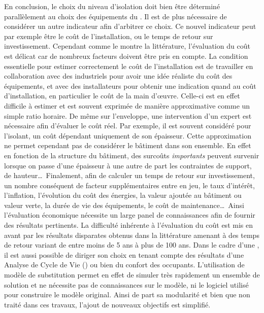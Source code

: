En conclusion, le choix du niveau d’isolation doit bien être déterminé parallèlement au choix des
équipements du . Il est de plus nécessaire de considérer un autre indicateur afin
d’arbitrer ce choix. Ce nouvel indicateur peut par exemple être le coût de l’installation,
ou le temps de retour sur investissement. Cependant comme le montre la littérature,
l’évaluation du coût est délicat car de nombreux facteurs doivent être pris en compte. La
condition essentielle pour estimer correctement le coût de l’installation est de
travailler en collaboration avec des industriels pour avoir une idée réaliste du coût des
équipements, et avec des installateurs pour obtenir une indication quand au coût
d’installation, en particulier le coût de la main d’œuvre. Celle-ci est en effet difficile
à estimer et est souvent exprimée de manière approximative comme un simple ratio horaire.
De même sur l’enveloppe, une intervention d’un expert est nécessaire afin d’évaluer le
coût réel. Par exemple, il est souvent considéré pour l’isolant, un coût dépendant
uniquement de son épaisseur. Cette approximation ne permet cependant pas de considérer le
bâtiment dans son ensemble. En effet en fonction de la structure du bâtiment, des surcoûts
\emph{importants} peuvent survenir lorsque on passe d’une épaisseur à une autre de part
les contraintes de support, de hauteur\dots\ Finalement, afin de calculer un
temps de retour sur investissement, un nombre conséquent de facteur supplémentaires entre en jeu, le
taux d’intérêt, l’inflation, l’évolution du coût des énergies, la valeur ajoutée au
bâtiment ou valeur verte, la durée de vie des équipements, le coût de maintenance\dots\
Ainsi l’évaluation économique nécessite un large panel de connaissances
afin de fournir des résultats pertinents.
La difficulté inhérente à l’évaluation du coût est mis en avant par les résultats
disparates obtenus dans la littérature amenant à des temps de retour variant de entre moins de
\num{5} ans à plus de \num{100} ans.
Dans le cadre d’une , il est aussi possible de diriger son choix en tenant
compte des résultats d’une Analyse de Cycle de Vie (\abr{ACV}) ou bien du confort des occupants.
L’utilisation de modèle de substitution permet en effet de simuler très rapidement
un ensemble de solution et ne nécessite pas de connaissances sur le modèle, ni le
logiciel utilisé pour construire le modèle original. Ainsi de part sa modularité
et bien que non traité dans ces travaux, l’ajout de nouveaux objectifs est simplifié.

